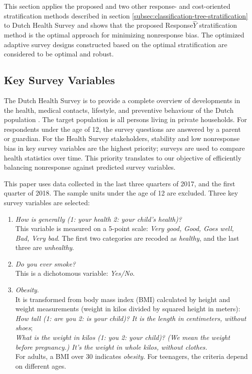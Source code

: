 \documentclass[12pt]{article}
\begin{document}
This section applies the proposed and two other response- and cost-oriented stratification methods described in section \ref{subsec:classification-tree-stratification} to Dutch Health Survey and shows that the proposed Response$\hat{Y}$ stratification method is the optimal approach for minimizing nonresponse bias.
The optimized adaptive survey designs constructed based on the optimal stratification are considered to be optimal and robust.

\subsection{Key Survey Variables}
\label{subsec:key-survey-variables}

The Dutch Health Survey is to provide a complete overview of developments in the health, medical contacts, lifestyle, and preventive behaviour of the Dutch population \cite{GEZO:2021}. The target population is all persons living in private households. For respondents under the age of 12, the survey questions are answered by a parent or guardian. For the Health Survey stakeholders, stability and low nonresponse bias in key survey variables are the highest priority; surveys are used to compare health statistics over time. This priority translates to our objective of efficiently balancing nonresponse against predicted survey variables.

This paper uses data collected in the last three quarters of 2017, and the first quarter of 2018.
The sample units under the age of 12 are excluded.
Three key survey variables are selected:
\begin{enumerate}
	\item {\em How is generally (1: your health 2: your child's health)?} \\
	This variable is measured on a 5-point scale: {\em Very good, Good, Goes well, Bad, Very bad}. The first two categories are recoded as {\em healthy}, and the last three are {\em unhealthy}.
	\item {\em Do you ever smoke?} \\
	This is a dichotomous variable: {\em Yes/No}.
	\item {\em Obesity}. \\
	It is transformed from body mass index (BMI) calculated by height and weight measurements (weight in kilos divided by squared height in meters): \\
	{\em How tall (1: are you 2: is your child)? It is the length in centimeters, without shoes}; \\
	{\em What is the weight in kilos (1: you 2: your child)? (We mean the weight before pregnancy.) It's the weight in whole kilos, without clothes.} \\
	For adults, a BMI over 30 indicates {\em obesity}. For teenagers, the criteria depend on different ages.
\end{enumerate}
\end{document}
